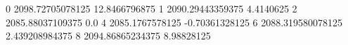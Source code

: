 0 2098.72705078125 12.8466796875
1 2090.29443359375 4.4140625
2 2085.88037109375 0.0
4 2085.1767578125 -0.70361328125
6 2088.319580078125 2.439208984375
8 2094.86865234375 8.98828125
